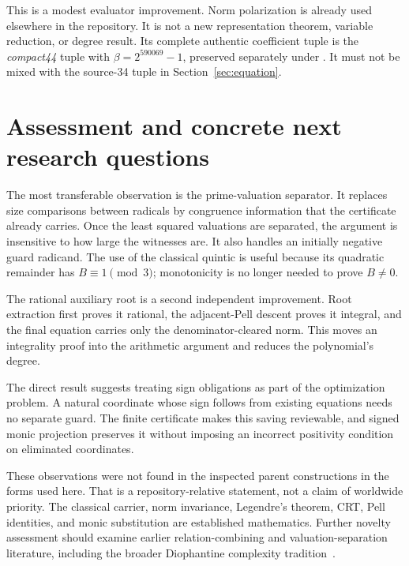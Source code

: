 This is a modest evaluator improvement. Norm polarization is already
used elsewhere in the repository. It is not a new representation
theorem, variable reduction, or degree result. Its complete authentic
coefficient tuple is the \emph{compact44} tuple with
$\beta=2^{590069}-1$, preserved separately under
.
It must not be mixed with the source-34 tuple in
Section~\ref{sec:equation}.

\section{Assessment and concrete next research questions}
\label{sec:assessment}

The most transferable observation is the prime-valuation separator.
It replaces size comparisons between radicals by congruence information
that the certificate already carries. Once the least squared valuations
are separated, the argument is insensitive to how large the witnesses
are. It also handles an initially negative guard radicand. The use of
the classical quintic is useful because its quadratic remainder has
$B\equiv1\pmod3$; monotonicity is no longer needed to prove $B\ne0$.

The rational auxiliary root is a second independent improvement. Root
extraction first proves it rational, the adjacent-Pell descent proves it
integral, and the final equation carries only the denominator-cleared
norm. This moves an integrality proof into the arithmetic argument and
reduces the polynomial's degree.

The direct result suggests treating sign obligations as part of the
optimization problem. A natural coordinate whose sign follows from
existing equations needs no separate guard. The finite certificate
makes this saving reviewable, and signed monic projection preserves it
without imposing an incorrect positivity condition on eliminated
coordinates.

These observations were not found in the inspected parent constructions
in the forms used here. That is a repository-relative statement, not a
claim of worldwide priority. The classical carrier, norm invariance,
Legendre's theorem, CRT, Pell identities, and monic substitution are
established mathematics. Further novelty assessment should examine
earlier relation-combining and valuation-separation literature, including
the broader Diophantine complexity tradition~\cite{mr}.

